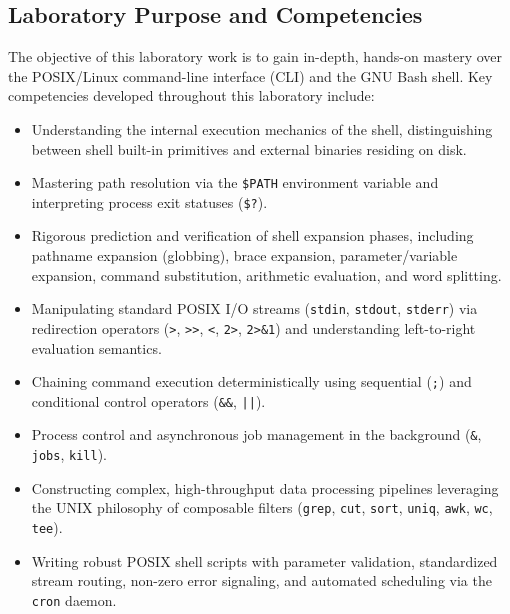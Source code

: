 \documentclass[12pt,a4paper]{article}
\begin{document}
\subsection{Laboratory Purpose and Competencies}
The objective of this laboratory work is to gain in-depth, hands-on mastery over the POSIX/Linux command-line interface (CLI) and the GNU Bash shell. Key competencies developed throughout this laboratory include:
\begin{itemize}
    \item Understanding the internal execution mechanics of the shell, distinguishing between shell built-in primitives and external binaries residing on disk.
    \item Mastering path resolution via the \texttt{\$PATH} environment variable and interpreting process exit statuses (\texttt{\$?}).
    \item Rigorous prediction and verification of shell expansion phases, including pathname expansion (globbing), brace expansion, parameter/variable expansion, command substitution, arithmetic evaluation, and word splitting.
    \item Manipulating standard POSIX I/O streams (\texttt{stdin}, \texttt{stdout}, \texttt{stderr}) via redirection operators (\texttt{>}, \texttt{>>}, \texttt{<}, \texttt{2>}, \texttt{2>\&1}) and understanding left-to-right evaluation semantics.
    \item Chaining command execution deterministically using sequential (\texttt{;}) and conditional control operators (\texttt{\&\&}, \texttt{||}).
    \item Process control and asynchronous job management in the background (\texttt{\&}, \texttt{jobs}, \texttt{kill}).
    \item Constructing complex, high-throughput data processing pipelines leveraging the UNIX philosophy of composable filters (\texttt{grep}, \texttt{cut}, \texttt{sort}, \texttt{uniq}, \texttt{awk}, \texttt{wc}, \texttt{tee}).
    \item Writing robust POSIX shell scripts with parameter validation, standardized stream routing, non-zero error signaling, and automated scheduling via the \texttt{cron} daemon.
\end{itemize}
\end{document}
